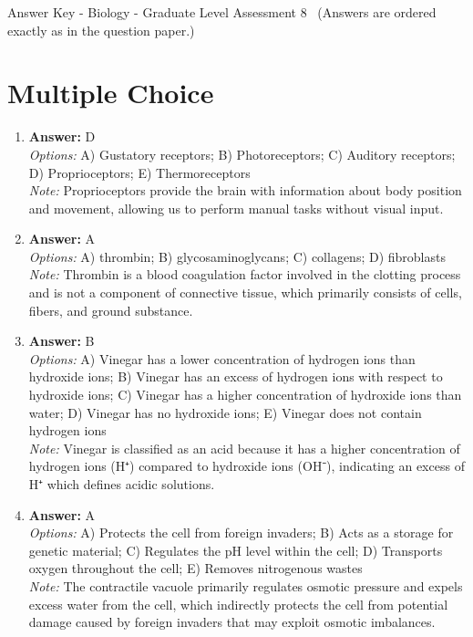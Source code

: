 \documentclass[12pt]{article}
\begin{document}
\begin{center}
Answer Key - Biology - Graduate Level Assessment 8 \
\small (Answers are ordered exactly as in the question paper.)
\end{center}

\section*{Multiple Choice}
\begin{enumerate}[label=\arabic*.]
\item \textbf{Answer:} D
\\ \textit{Options:} A) Gustatory receptors; B) Photoreceptors; C) Auditory receptors; D) Proprioceptors; E) Thermoreceptors
\\ \textit{Note:} Proprioceptors provide the brain with information about body position and movement, allowing us to perform manual tasks without visual input.
\item \textbf{Answer:} A
\\ \textit{Options:} A) thrombin; B) glycosaminoglycans; C) collagens; D) fibroblasts
\\ \textit{Note:} Thrombin is a blood coagulation factor involved in the clotting process and is not a component of connective tissue, which primarily consists of cells, fibers, and ground substance.
\item \textbf{Answer:} B
\\ \textit{Options:} A) Vinegar has a lower concentration of hydrogen ions than hydroxide ions; B) Vinegar has an excess of hydrogen ions with respect to hydroxide ions; C) Vinegar has a higher concentration of hydroxide ions than water; D) Vinegar has no hydroxide ions; E) Vinegar does not contain hydrogen ions
\\ \textit{Note:} Vinegar is classified as an acid because it has a higher concentration of hydrogen ions (H⁺) compared to hydroxide ions (OH⁻), indicating an excess of H⁺ which defines acidic solutions.
\item \textbf{Answer:} A
\\ \textit{Options:} A) Protects the cell from foreign invaders; B) Acts as a storage for genetic material; C) Regulates the pH level within the cell; D) Transports oxygen throughout the cell; E) Removes nitrogenous wastes
\\ \textit{Note:} The contractile vacuole primarily regulates osmotic pressure and expels excess water from the cell, which indirectly protects the cell from potential damage caused by foreign invaders that may exploit osmotic imbalances.

\end{enumerate}
\end{document}
